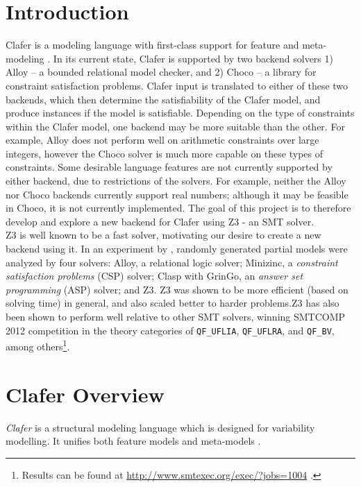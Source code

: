 \documentclass{article}
\begin{document}
\section{Introduction}
Clafer is a modeling language with first-class support for feature and meta-modeling \cite{BakClaferSLE2010}. In its current state, Clafer is supported by two backend solvers 1) Alloy -- a bounded relational model checker, and 2) Choco -- a library for constraint satisfaction problems. Clafer input is translated to either of these two backends, which then determine the satisfiability of the Clafer model, and produce instances if the model is satisfiable. Depending on the type of constraints within the Clafer model, one backend may be more suitable than the other. For example, Alloy does not perform well on arithmetic constraints over large integers, however the Choco solver is much more capable on these types of constraints. Some desirable language features are not currently supported by either backend, due to restrictions of the solvers. For example, neither the Alloy nor Choco backends currently support real numbers; although it may be feasible in Choco, it is not currently implemented. The goal of this project is to therefore develop and explore a new backend for Clafer using Z3 - an SMT solver. \\
\indent Z3 is well known to be a fast solver, motivating our desire to create a new backend using it. In an experiment by \cite{Saadatpanah2012}, randomly generated partial models were analyzed by four solvers: Alloy, a relational logic solver; Minizinc, a  \textit{constraint satisfaction problems} (CSP) solver; Clasp with GrinGo, an \textit{answer set programming} (ASP) solver; and Z3. Z3 was shown to be more efficient (based on solving time) in general, and also scaled better to harder problems.Z3 has also been shown to perform well relative to other SMT solvers, winning SMTCOMP 2012 competition in the theory categories of \texttt{QF\_UFLIA}, \texttt{QF\_UFLRA}, and \texttt{QF\_BV}, among others\footnote{Results can be found at \url{http://www.smtexec.org/exec/?jobs=1004} .}.

\section{Clafer Overview}

\emph{Clafer} is a structural modeling language which is designed for variability modelling. It unifies both feature models  and meta-models \cite{BakClaferSLE2010}.
\end{document}
